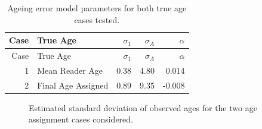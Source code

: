 \documentclass[11pt]{book}
\begin{document}
\newpage
\begin{longtable}[]{@{}rlrrr@{}}
\caption{\label{tab:unnamed-chunk-28}Ageing error model parameters for both true age cases tested.}\tabularnewline
\toprule
Case & True Age & \(\sigma_1\) & \(\sigma_A\) & \(\alpha\)\tabularnewline
\midrule
\endfirsthead
\toprule
Case & True Age & \(\sigma_1\) & \(\sigma_A\) & \(\alpha\)\tabularnewline
\midrule
\endhead
1 & Mean Reader Age & 0.38 & 4.80 & 0.014\tabularnewline
2 & Final Age Assigned & 0.89 & 9.35 & -0.008\tabularnewline
\bottomrule
\end{longtable}
\begin{figure}[htb]

{\centering {} 

}

\caption{Estimated standard deviation of observed ages for the two age assignment cases considered.}\label{fig:unnamed-chunk-30}
\end{figure}
\newpage
\end{document}
